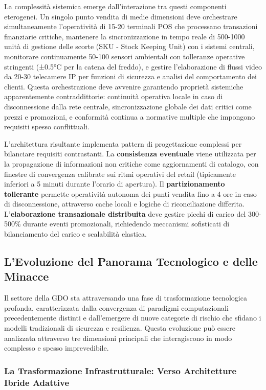 La complessità sistemica emerge dall'interazione tra questi componenti eterogenei. Un singolo punto vendita di medie dimensioni deve orchestrare simultaneamente l'operatività di 15-20 terminali POS che processano transazioni finanziarie critiche, mantenere la sincronizzazione in tempo reale di 500-1000 unità di gestione delle scorte (SKU - Stock Keeping Unit) con i sistemi centrali, monitorare continuamente 50-100 sensori ambientali con tolleranze operative stringenti (±0.5°C per la catena del freddo), e gestire l'elaborazione di flussi video da 20-30 telecamere IP per funzioni di sicurezza e analisi del comportamento dei clienti. Questa orchestrazione deve avvenire garantendo proprietà sistemiche apparentemente contraddittorie: continuità operativa locale in caso di disconnessione dalla rete centrale, sincronizzazione globale dei dati critici come prezzi e promozioni, e conformità continua a normative multiple che impongono requisiti spesso conflittuali.

L'architettura risultante implementa pattern di progettazione complessi per bilanciare requisiti contrastanti. La \textbf{consistenza eventuale} viene utilizzata per la propagazione di informazioni non critiche come aggiornamenti di catalogo, con finestre di convergenza calibrate sui ritmi operativi del retail (tipicamente inferiori a 5 minuti durante l'orario di apertura). Il \textbf{partizionamento tollerante} permette operatività autonoma dei punti vendita fino a 4 ore in caso di disconnessione, attraverso cache locali e logiche di riconciliazione differita. L'\textbf{elaborazione transazionale distribuita} deve gestire picchi di carico del 300-500\% durante eventi promozionali\autocite{Osservatorio2024}, richiedendo meccanismi sofisticati di bilanciamento del carico e scalabilità elastica.

\subsection{L'Evoluzione del Panorama Tecnologico e delle Minacce}

Il settore della GDO sta attraversando una fase di trasformazione tecnologica profonda, caratterizzata dalla convergenza di paradigmi computazionali precedentemente distinti e dall'emergere di nuove categorie di rischio che sfidano i modelli tradizionali di sicurezza e resilienza. Questa evoluzione può essere analizzata attraverso tre dimensioni principali che interagiscono in modo complesso e spesso imprevedibile.

\subsubsection{La Trasformazione Infrastrutturale: Verso Architetture Ibride Adattive}


